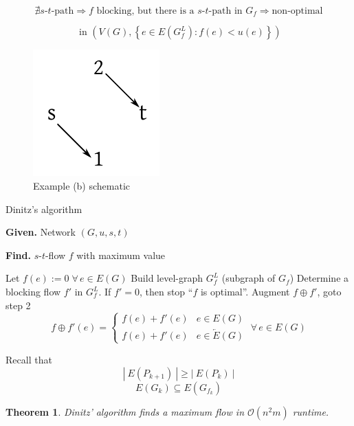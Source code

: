 \documentclass{article}
\newtheorem{theorem}{Theorem}
\newcommand{\card}[1]{\left|\:\!#1\:\!\right|}
\newcommand{\set}[1]{\left\{#1\right\}}
\newcommand{\given}[1]{\textbf{Given.} #1\par}
\newcommand{\find}[1]{\textbf{Find.} #1\par}
\newcommand{\gath}[2]{$#1$-$#2$-path} %
\newcommand{\fall}{\;\forall\,}
\begin{document}
\begin{itemize}
    \[
      \nexists \text{\gath st}
        \Rightarrow f \text{ blocking, but there is a \gath st in } G_f \Rightarrow \text{non-optimal}
    \]

    \[
      \text{ in } (V(G), \set{e \in E(G^L_f): f(e) < u(e)})
    \]
    \begin{figure}[!ht]
      \begin{center}
       \includegraphics{img/blocking_flows_b_in.pdf}
       \caption{Example (b) schematic}
      \end{center}
    \end{figure}
\end{itemize}


\begin{algorithm}
  \caption{Dinitz's algorithm}
  \label{dinitz-algo}
  \given{Network $(G, u, s, t)$}
  \find{$s$-$t$-flow $f$ with maximum value}
\begin{algorithmic}[1]
  \State Let $f(e) := 0 \fall e \in E(G)$
  \State Build level-graph $G^L_f$ (subgraph of $G_f$)
  \State Determine a blocking flow $f'$ in $G^L_f$. If $f' = 0$, then stop ``$f$ is optimal''.
  \State Augment $f \oplus f'$, goto step 2
  \[
    f \oplus f'(e) = \begin{cases}
      f(e) + f'(e) & e \in E(G) \\
      f(e) + f'(e) & e \in \overleftarrow{E}(G)
    \end{cases}
    \fall e \in E(G)
  \]
\end{algorithmic}
\end{algorithm}

Recall that
  \[ \card{E(P_{k+1})} \geq \card{E(P_k)} \]
  \[ E(G_k) \subseteq E(G_{f_k}) \]

\begin{theorem}\label{satz-4.7}
  Dinitz' algorithm finds a maximum flow in $\mathcal{O}(n^2m)$ runtime.
\end{theorem}
\end{document}

